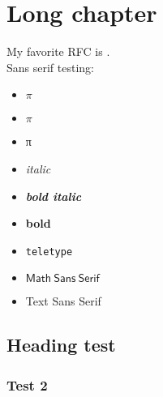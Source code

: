  
\chapter{Long chapter}

My favorite RFC is \cite{rfc2549}.\blindtext[1]\\
Sans serif testing:
\begin{itemize}
    \item \textsf{$\pi$}
    \item \textsf{$π$}
    \item \textsf{π}
    \item \textsf{\emph{italic}}
    \item \textsf{\textbf{\emph{bold italic}}}
    \item \textsf{\textbf{bold}}
    \item \textsf{\texttt{teletype}}
    \item $\mathsf{Math\ Sans\ Serif}$
    \item \textsf{Text Sans Serif}
\end{itemize}

\section{Heading test}
\blindtext[8]
\subsection{Test 2}
\blindtext[1]
